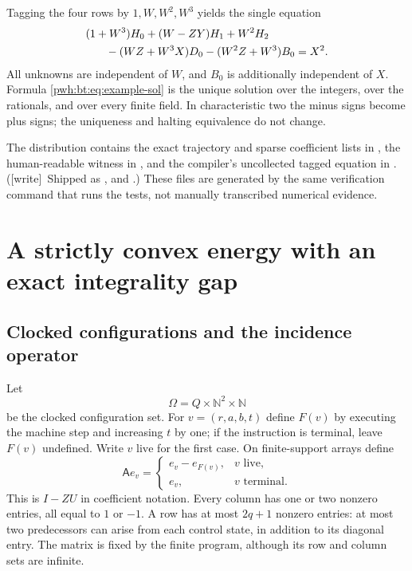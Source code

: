\documentclass[11pt,letterpaper]{article}
\numberwithin{equation}{section}
\theoremstyle{definition}
\newcommand{\N}{\mathbb N}
\newcommand{\Ann}{\mathsf{A}}
\newcommand{\wtag}{\textup{[write]}}
\begin{document}
Tagging the four rows by $1,W,W^2,W^3$ yields the single equation
\begin{align}\label{pwh:bt:eq:example-scalar}
 &(1+W^3)H_0+(W-ZY)H_1+W^2H_2\nonumber\\
 &\hspace{1.8em}-(WZ+W^3X)D_0-(W^2Z+W^3)B_0=X^2.
\end{align}
All unknowns are independent of $W$, and $B_0$ is additionally
independent of $X$. Formula \eqref{pwh:bt:eq:example-sol} is the unique solution
over the integers, over the rationals, and over every finite field.
In characteristic two the minus signs become plus signs; the uniqueness
and halting equivalence do not change.

The distribution contains the exact trajectory and sparse coefficient
lists in , the human-readable
witness in , and the compiler's
uncollected tagged equation in .
(\wtag\ Shipped as ,
 and
.)
These files are generated by the same verification command that runs the
tests, not manually transcribed numerical evidence.

\section{A strictly convex energy with an exact integrality gap}\label{pwh:bt:sec:energy}

\subsection{Clocked configurations and the incidence operator}
Let
\[
 \Omega=Q\times\N^2\times\N
\]
be the clocked configuration set. For $v=(r,a,b,t)$ define $F(v)$ by
executing the machine step and increasing $t$ by one; if the instruction
is terminal, leave $F(v)$ undefined. Write $v\text{ live}$ for the first
case. On finite-support arrays define
\begin{equation}\label{pwh:bt:eq:A}
 \Ann e_v=\begin{cases}e_v-e_{F(v)},&v\text{ live},\\
 e_v,&v\text{ terminal}.
 \end{cases}
\end{equation}
This is $I-ZU$ in coefficient notation. Every column has one or two
nonzero entries, all equal to $1$ or $-1$. A row has at most $2q+1$
nonzero entries: at most two predecessors can arise from each control
state, in addition to its diagonal entry. The matrix is fixed by the
finite program, although its row and column sets are infinite.
\end{document}
